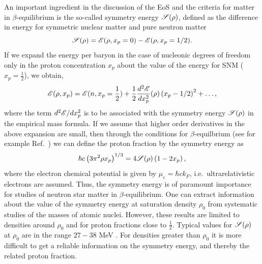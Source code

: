 An important ingredient in the discussion of the EoS and the criteria
for matter in $\beta$-equilibrium is the so-called symmetry energy
${\cal S} (\rho)$, defined as the difference in energy for symmetric
nuclear matter and pure neutron matter
\[
      {\cal S} (\rho) = {\cal E} (\rho,x_p=0) - {\cal E} (\rho,x_p=1/2 ).
\]
If we expand the energy per baryon in the case of nucleonic degrees of
freedom only in the proton concentration $x_p$ about the value of the
energy for SNM ($x_p=\frac{1}{2}$), we obtain,
\[
     {\cal E} (\rho,x_p)={\cal E} (n,x_p=\frac{1}{2})+
     \frac{1}{2}\frac{d^2 {\cal E}}{dx_p^2}(\rho)\left(x_p-1/2\right)^2+\dots ,
\]
where the term $d^2 {\cal E}/dx_p^2$ is to be associated with the
symmetry energy ${\cal S} (\rho)$ in the empirical mass formula. If we
assume that higher order derivatives in the above expansion are small,
then through the conditions for $\beta$-equilbrium (see for example Ref.~\cite{hh2000}) we can define the proton fraction by the
symmetry energy as
\[
    \hbar c\left(3\pi^2\rho x_p\right)^{1/3} = 4{\cal S}
    (\rho)\left(1-2x_p\right),
\]
where the electron chemical potential is given by $\mu_e = \hbar c
k_F$, i.e.\ ultrarelativistic electrons are assumed.  Thus, the
symmetry energy is of paramount importance for studies of neutron star
matter in $\beta$-equilibrium.  One can extract information about the
value of the symmetry energy at saturation density $\rho_0$ from
systematic studies of the masses of atomic nuclei. However, these
results are limited to densities around $\rho_0$ and for proton fractions
close to $\frac{1}{2}$.  Typical values for ${\cal S} (\rho)$ at
$\rho_0$ are in the range $27-38$ MeV \cite{horowitz2014}.  For densities greater than $\rho_0$
it is more difficult to get a reliable information on the symmetry
energy, and thereby the related proton fraction.


